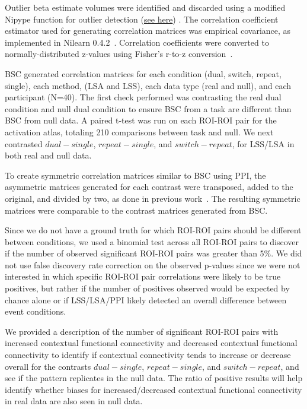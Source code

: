 \documentclass[phd,appendix,figures]{uithesis}
\begin{document}
Outlier beta estimate volumes were identified and discarded using a
modified Nipype function for outlier detection
(\href{https://github.com/HBClab/NiBetaSeries/blob/a45c0a1f/src/nibetaseries/interfaces/nilearn.py#L153}{see here}) \cite{Crosby1994}.
The correlation coefficient estimator used for generating correlation matrices
was empirical covariance, as implemented in Nilearn 0.4.2~\cite{Abraham2014}.
Correlation coefficients were converted to normally-distributed z-values using
Fisher's r-to-z conversion~\cite{Fisher1915}.

BSC generated correlation matrices for each condition (dual, switch, repeat, single),
each method, (LSA and LSS), each data type (real and null), and each participant (N=40).
The first check performed was contrasting the real dual condition and null dual condition
to ensure BSC from a task are different than BSC from null data.
A paired t-test was run on each ROI-ROI pair for the activation atlas, totaling 210 comparisons
between task and null.
We next contrasted $dual - single$, $repeat - single$, and $switch - repeat$, for LSS/LSA in both
real and null data.

To create symmetric correlation matrices similar to BSC using PPI, the asymmetric matrices generated for
each contrast were transposed, added to the original, and divided by two, as done in previous work~\cite{Di2019a}.
The resulting symmetric matrices were comparable to the contrast matrices generated from BSC.

Since we do not have a ground truth for which ROI-ROI pairs should be different between conditions,
we used a binomial test across all ROI-ROI pairs to discover if the number of observed significant ROI-ROI pairs was greater
than 5\%.
We did not use false discovery rate correction on the observed p-values since we were not interested in
which specific ROI-ROI pair correlations were likely to be true positives, but rather if the number of positives
observed would be expected by chance alone or if LSS/LSA/PPI likely detected an overall difference between event conditions.

We provided a description of the number of significant ROI-ROI pairs with increased contextual functional connectivity and
decreased contextual functional connectivity to identify if contextual connectivity tends to increase or decrease overall
for the contrasts $dual - single$, $repeat - single$, and $switch - repeat$, and see if the pattern replicates
in the null data. 
The ratio of positive results will help identify whether biases for increased/decreased contextual functional connectivity
in real data are also seen in null data.
\end{document}
